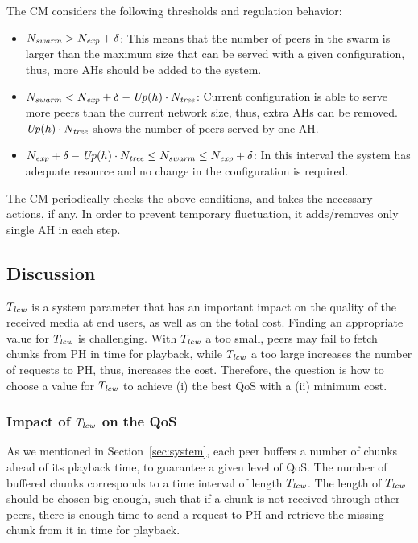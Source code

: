 The CM considers the following thresholds and regulation behavior:
\begin{itemize}
\item $N_{\mathit{swarm}} > N_{\mathit{exp}} + \delta$: This means that the number of peers in the swarm is larger than the maximum size that can be served with a given configuration, thus, more AHs should be added to the system. 
\item $N_{\mathit{swarm}} < N_{\mathit{exp}} + \delta - \mathit{Up}(h) \cdot N_{\mathit{tree}}$: Current configuration is able to serve more peers than the current network size, thus, extra AHs can be removed. $\mathit{Up}(h) \cdot N_{\mathit{tree}}$ shows the number of peers served by one AH. 
\item $N_{\mathit{exp}} + \delta - \mathit{Up}(h) \cdot N_{\mathit{tree}} \leq N_{\mathit{swarm}} \leq N_{\mathit{exp}} + \delta$: In this interval the system has adequate resource and no change in the configuration is required.
\end{itemize}

The CM periodically checks the above conditions, and takes the necessary actions,
if any. In order to prevent temporary fluctuation, it adds/removes only single
AH in each step.

\subsection{Discussion} \label{lcw}

$T_{\mathit{lcw}}$ is a system parameter that has an important impact on the quality of
the received media at end users, as well as on the total cost. Finding an
appropriate value for $T_{\mathit{lcw}}$ is challenging. With $T_{\mathit{lcw}}$ a too small, peers
may fail to fetch chunks from PH in time for playback, while 
$T_{\mathit{lcw}}$ a too large increases the number of requests to PH, thus, increases the cost.
Therefore, the question is how to choose a value for $T_{\mathit{lcw}}$ to achieve (i)
the best QoS with a (ii) minimum cost.

\subsubsection{Impact of $T_{\mathit{lcw}}$ on the QoS} 

As we mentioned in Section~\ref{sec:system}, each peer buffers a number of
chunks ahead of its playback time, to guarantee a given level of QoS. The
number of buffered chunks corresponds to a time interval of length $T_{\mathit{lcw}}$.
The length of $T_{\mathit{lcw}}$ should be chosen big enough, such that if a chunk is not
received through other peers, there is enough time to send a request to PH and
retrieve the missing chunk from it in time for playback.

